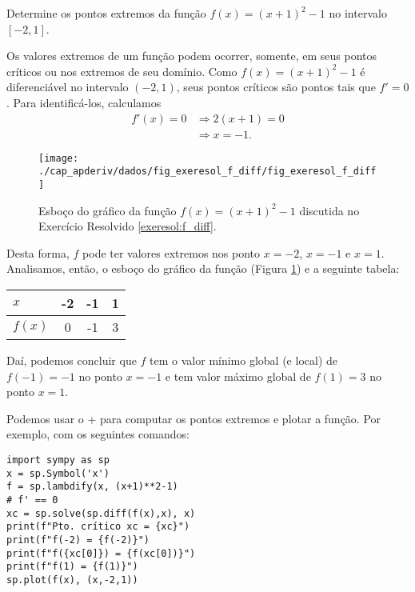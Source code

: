 \begin{exeresol}\label{exeresol:f_diff}
  Determine os pontos extremos da função $f(x) = (x+1)^2-1$ no intervalo $[-2,1]$.
\end{exeresol}
\begin{resol}
  Os valores extremos de um função podem ocorrer, somente, em seus pontos críticos ou nos extremos de seu domínio. Como $f(x) = (x+1)^2-1$ é diferenciável no intervalo $(-2,1)$, seus pontos críticos são pontos tais que $f'=0$. Para identificá-los, calculamos
  \begin{align}
    f'(x)=0 &\Rightarrow 2(x+1) = 0\\
            &\Rightarrow x = -1.
  \end{align}

  \begin{figure}[H]
    \centering
    \texttt{[image: ./cap\_apderiv/dados/fig\_exeresol\_f\_diff/fig\_exeresol\_f\_diff]}
    \caption{Esboço do gráfico da função $f(x) = (x+1)^2-1$ discutida no Exercício Resolvido \ref{exeresol:f_diff}.}
    \label{fig:exeresol_f_diff}
  \end{figure}

  Desta forma, $f$ pode ter valores extremos nos ponto $x=-2$, $x=-1$ e $x=1$. Analisamos, então, o esboço do gráfico da função (Figura \ref{fig:exeresol_f_diff}) e a seguinte tabela:\\
  \begin{center}
  \begin{tabular}[H]{l|ccc}
    $x$ & -2 & -1 & 1 \\\hline
    $f(x)$ & 0 & -1 & 3\\\hline
  \end{tabular}
\end{center}
Daí, podemos concluir que $f$ tem o valor mínimo global (e local) de $f(-1)=-1$ no ponto $x=-1$ e tem valor máximo global de $f(1)=3$ no ponto $x=1$.

\ifispython
Podemos usar o {\python}+{\sympy} para computar os pontos extremos e plotar a função. Por exemplo, com os seguintes comandos:
\begin{lstlisting}
import sympy as sp
x = sp.Symbol('x')
f = sp.lambdify(x, (x+1)**2-1)
# f' == 0
xc = sp.solve(sp.diff(f(x),x), x)
print(f"Pto. crítico xc = {xc}")
print(f"f(-2) = {f(-2)}")
print(f"f({xc[0]}) = {f(xc[0])}")
print(f"f(1) = {f(1)}")
sp.plot(f(x), (x,-2,1))
\end{lstlisting}
\fi
\end{resol}

